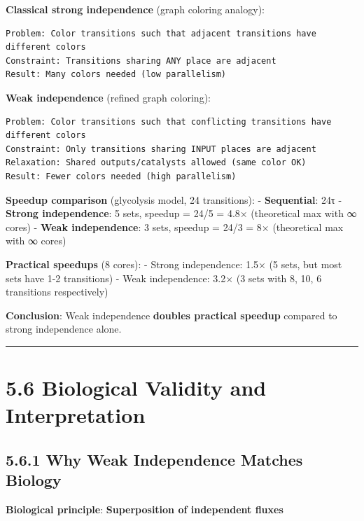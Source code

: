 \textbf{Classical strong independence} (graph coloring analogy):

\begin{lstlisting}
Problem: Color transitions such that adjacent transitions have different colors
Constraint: Transitions sharing ANY place are adjacent
Result: Many colors needed (low parallelism)
\end{lstlisting}

\textbf{Weak independence} (refined graph coloring):

\begin{lstlisting}
Problem: Color transitions such that conflicting transitions have different colors
Constraint: Only transitions sharing INPUT places are adjacent
Relaxation: Shared outputs/catalysts allowed (same color OK)
Result: Fewer colors needed (high parallelism)
\end{lstlisting}

\textbf{Speedup comparison} (glycolysis model, 24 transitions): -
\textbf{Sequential}: 24τ - \textbf{Strong independence}: 5 sets, speedup
= 24/5 = 4.8× (theoretical max with ∞ cores) - \textbf{Weak
independence}: 3 sets, speedup = 24/3 = 8× (theoretical max with ∞
cores)

\textbf{Practical speedups} (8 cores): - Strong independence: 1.5× (5
sets, but most sets have 1-2 transitions) - Weak independence: 3.2× (3
sets with 8, 10, 6 transitions respectively)

\textbf{Conclusion}: Weak independence \textbf{doubles practical
speedup} compared to strong independence alone.

\begin{center}\rule{0.5\linewidth}{0.5pt}\end{center}

\hypertarget{biological-validity-and-interpretation}{%
\section{5.6 Biological Validity and
Interpretation}\label{biological-validity-and-interpretation}}

\hypertarget{why-weak-independence-matches-biology}{%
\subsection{5.6.1 Why Weak Independence Matches
Biology}\label{why-weak-independence-matches-biology}}

\textbf{Biological principle}: \textbf{Superposition of independent
fluxes}

